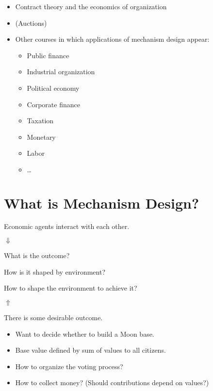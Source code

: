 \documentclass[english,handout]{beamer}		%
\def\lyxframeend{} %
\begin{document}
\begin{itemize}
	\item Contract theory and the economics of organization
	\item (Auctions)
	\item Other courses in which applications of mechanism design appear:
	\begin{itemize}
		\item Public finance
		\item Industrial organization
		\item Political economy
		\item Corporate finance
		\item Taxation
		\item Monetary
		\item Labor
		\item \ldots{}
	\end{itemize}
\end{itemize}
\lyxframeend





\section{What is Mechanism Design?}

\begin{center}
	Economic agents interact with each other.
	\pause
	
	$\Downarrow$
	
	What is the outcome? 
	
	How is it shaped by environment?
\end{center}
\lyxframeend


\begin{center}
	\pause[2] 
	How to shape the environment to achieve it?
	
	$\Uparrow$
	
	\pause[1]
	There is some desirable outcome.
\end{center}
\lyxframeend


\begin{itemize}
	\item Want to decide whether to build a Moon base.
	\item Base value defined by sum of values to all citizens.
	\item How to organize the voting process?
	\item How to collect money? (Should contributions depend on values?)
\end{itemize}
\lyxframeend
\end{document}
